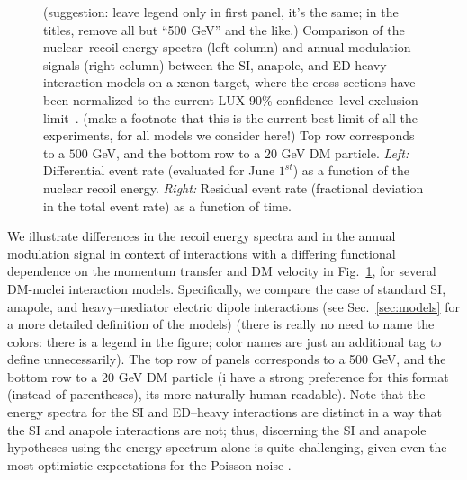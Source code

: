 \documentclass[11pt]{article}
\newcommand{\Sec}[1]{Sec.~\ref{#1}} \newcommand{\Secs}[2]{Secs.~\ref{#1} and \ref{#2}} \newcommand{\Secm}[2]{Secs.~\ref{#1} through \ref{#2}}
\newcommand{\Fig}[1]{Fig.~\ref{#1}} \newcommand{\Figs}[2]{Figs.~\ref{#1} and \ref{#2}}
\newcommand{\vgColor}{magenta}
\newcommand{\vg}[1]{{\color{\vgColor} #1}}
\begin{document}
\begin{figure}
\caption{\label{fig:diff_rate_comp}
\vg{(suggestion: leave legend only in first panel, it's the same; in the titles, remove all but ``500 GeV'' and the like.)} Comparison of the nuclear--recoil energy spectra (left column) and annual modulation signals (right column) between the SI, anapole, and ED-heavy interaction models on a xenon target, where the cross sections have been normalized to the current LUX 90\% confidence--level exclusion limit~\cite{Akerib:2016vxi}. \vg{(make a footnote that this is the current best limit of all the experiments, for all models we consider here!)} Top row corresponds to a $500$ GeV, and the bottom row to a $20$ GeV DM particle. \emph{Left:} Differential event rate (evaluated for June $1^{st}$) as a function of the nuclear recoil energy. \emph{Right:} Residual event rate (fractional deviation in the total event rate) as a function of time.}
\end{figure}
We illustrate differences in the recoil energy spectra and in the annual modulation signal in context of interactions with a differing functional dependence on the momentum transfer and DM velocity in \Fig{fig:diff_rate_comp}, for several DM-nuclei interaction models. Specifically, we compare the case of standard SI, anapole, and heavy--mediator electric dipole interactions (see \Sec{sec:models} for a more detailed definition of the models) \vg{(there is really no need to name the colors: there is a legend in the figure; color names are just an additional tag to define unnecessarily)}. The top row of panels corresponds to a 500 GeV, and the bottom row to a 20 GeV DM particle \vg{(i have a strong preference for this format (instead of parentheses), its more naturally human-readable)}.  Note that the energy spectra for the SI and ED--heavy interactions are distinct in a way that the SI and anapole interactions are not; thus, discerning the SI and anapole hypotheses using the energy spectrum alone is quite challenging, given even the most optimistic expectations for the Poisson noise \cite{Gluscevic:2015sqa}. 
\end{document}
